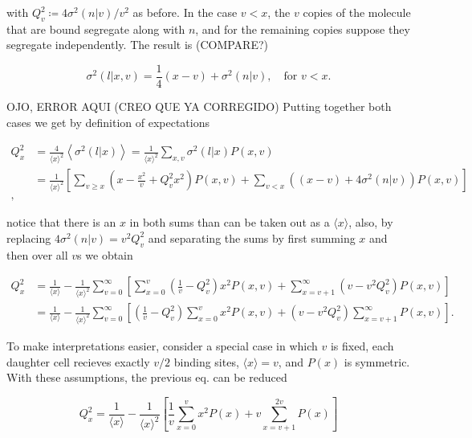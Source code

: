with $Q_v^2 \coloneqq 4\sigma^2(n|v)/v^2$ as before. In the case $v<x$, the $v$ copies of the molecule that are bound segregate along with $n$, and for the remaining copies suppose they segregate independently. The result is (COMPARE?)

\begin{equation}
  \sigma^2(l|x,v) = \frac{1}{4}(x-v) + \sigma^2(n|v),\quad \text{for } v<x.
\end{equation}

OJO, ERROR AQUI (CREO QUE YA CORREGIDO)
Putting together both cases we get by definition of expectations

\begin{equation*}
  \begin{split}
    Q_x^2 &= \frac{4}{\langle x\rangle^2}\left\langle\sigma^2(l|x)\right\rangle = \frac{1}{\langle x\rangle^2}\sum_{x,v}\sigma^2(l|x)P(x,v)\\
    &=\frac{1}{\langle x\rangle^2}\left[\sum_{v\geq x}\left(x-\frac{x^2}{v}+Q_v^2x^2\right)P(x,v) + \sum_{v<x}\left((x-v)+4\sigma^2(n|v)\right)P(x,v)\right]\\,
  \end{split}
\end{equation*}

notice that there is an $x$ in both sums than can be taken out as a $\langle x\rangle$, also, by replacing $4\sigma^2(n|v) = v^2Q_v^2$ and separating the sums by first summing $x$ and then over all $v$s we obtain

\begin{equation}
  \begin{split}
     Q_x^2 &= \frac{1}{\langle x\rangle} - \frac{1}{\langle x\rangle^2}\sum_{v=0}^\infty\left[\sum_{x=0}^v\left(\frac{1}{v}-Q_v^2\right)x^2P(x,v)+\sum_{x=v+1}^\infty\left(v-v^2Q_v^2\right)P(x,v)\right]\\
     &=\frac{1}{\langle x\rangle} - \frac{1}{\langle x\rangle^2}\sum_{v=0}^\infty\left[\left(\frac{1}{v}-Q_v^2\right)\sum_{x=0}^vx^2P(x,v)+\left(v-v^2Q_v^2\right)\sum_{x=v+1}^\infty P(x,v)\right].
  \end{split}
\end{equation}

To make interpretations easier, consider a special case in which $v$ is fixed, each daughter cell recieves exactly $v/2$ binding sites, $\langle x\rangle = v$, and $P(x)$ is symmetric. With these assumptions, the previous eq. can be reduced

\begin{equation*}
  Q_x^2 = \frac{1}{\langle x\rangle} - \frac{1}{\langle x\rangle^2}\left[\frac{1}{v}\sum_{x=0}^vx^2P(x)+v\sum_{x=v+1}^{2v}P(x)\right]
\end{equation*}


